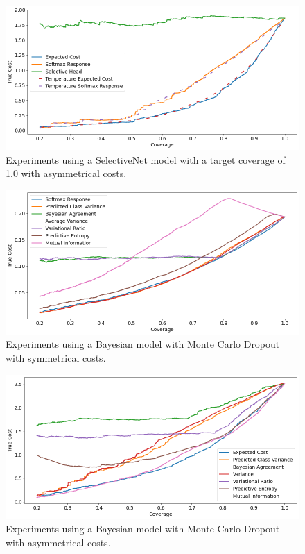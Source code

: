 \begin{figure}[h]
	\includegraphics[width=\textwidth]{images/multi-class/sn1.0-asym.png}
	\caption{Experiments using a SelectiveNet model with a target coverage of 1.0 with asymmetrical costs.}
\end{figure}

\begin{figure}[h]
	\includegraphics[width=\textwidth]{images/multi-class/mc-dropout-sym.png}
	\caption{Experiments using a Bayesian model with Monte Carlo Dropout with symmetrical costs.}
\end{figure}

\begin{figure}[h]
	\includegraphics[width=\textwidth]{images/multi-class/mc-dropout-asym.png}
	\caption{Experiments using a Bayesian model with Monte Carlo Dropout with asymmetrical costs.}
\end{figure}

